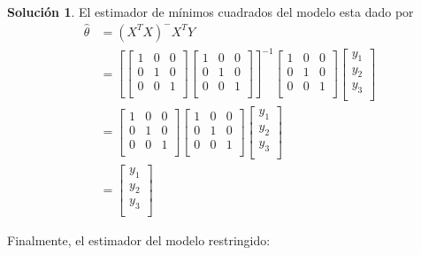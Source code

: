 \documentclass[12pt]{article}
\theoremstyle{plain}
\theoremstyle{definition}
\theoremstyle{definition}
\theoremstyle{definition}
\newtheorem*{solution}{Solución}
\begin{document}
\begin{solution}
El estimador de mínimos cuadrados del modelo esta dado por
\begin{align*}
  \hat{\theta} &= (X^TX)^-X^TY\\
  &= \left[ \begin{bmatrix}
     1 & 0 & 0 \\
    0 & 1 & 0 \\
  0 & 0 & 1 \\
\end{bmatrix}\begin{bmatrix}
     1 & 0 & 0 \\
    0 & 1 & 0 \\
  0 & 0 & 1 \\
\end{bmatrix}\right]^{-1}\begin{bmatrix}
     1 & 0 & 0 \\
    0 & 1 & 0 \\
  0 & 0 & 1 \\
\end{bmatrix} \begin{bmatrix}
     y_1 \\
    y_2 \\
   y_3 \\
\end{bmatrix}\\
&= \begin{bmatrix}
     1 & 0 & 0 \\
    0 & 1 & 0 \\
  0 & 0 & 1 \\
\end{bmatrix}\begin{bmatrix}
     1 & 0 & 0 \\
    0 & 1 & 0 \\
  0 & 0 & 1 \\
\end{bmatrix}\begin{bmatrix}
     y_1 \\
    y_2 \\
   y_3 \\
\end{bmatrix}\\
  & = \begin{bmatrix}
     y_1 \\
    y_2 \\
   y_3 \\
\end{bmatrix}
\end{align*}

Finalmente, el estimador del modelo restringido:


\end{solution}
\end{document}
